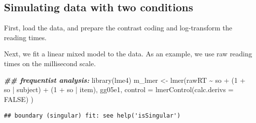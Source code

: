 \documentclass[
  12pt,
]{krantz}
\newenvironment{Shaded}{\begin{snugshade}}{\end{snugshade}}
\newcommand{\AttributeTok}[1]{\textcolor[rgb]{0.77,0.63,0.00}{#1}}
\newcommand{\ConstantTok}[1]{\textcolor[rgb]{0.00,0.00,0.00}{#1}}
\newcommand{\DecValTok}[1]{\textcolor[rgb]{0.00,0.00,0.81}{#1}}
\newcommand{\DocumentationTok}[1]{\textcolor[rgb]{0.56,0.35,0.01}{\textbf{\textit{#1}}}}
\newcommand{\FunctionTok}[1]{\textcolor[rgb]{0.00,0.00,0.00}{#1}}
\newcommand{\NormalTok}[1]{#1}
\newcommand{\OtherTok}[1]{\textcolor[rgb]{0.56,0.35,0.01}{#1}}
\newcommand{\SpecialCharTok}[1]{\textcolor[rgb]{0.00,0.00,0.00}{#1}}
\newcommand{\StringTok}[1]{\textcolor[rgb]{0.31,0.60,0.02}{#1}}
\theoremstyle{definition}
\theoremstyle{definition}
\theoremstyle{definition}
\theoremstyle{definition}
\theoremstyle{remark}
\begin{document}
\hypertarget{simulating-data-with-two-conditions}{%
\subsection{Simulating data with two conditions}\label{simulating-data-with-two-conditions}}

First, load the data, and prepare the contrast coding and log-transform the reading times.

\begin{Shaded}
\end{Shaded}

Next, we fit a linear mixed model to the data. As an example, we use raw reading times on the millisecond scale.

\begin{Shaded}
\begin{Highlighting}[]
\DocumentationTok{\#\# frequentist analysis:}
\FunctionTok{library}\NormalTok{(lme4)}
\NormalTok{m\_lmer }\OtherTok{\textless{}{-}} \FunctionTok{lmer}\NormalTok{(rawRT }\SpecialCharTok{\textasciitilde{}}\NormalTok{ so }\SpecialCharTok{+}\NormalTok{ (}\DecValTok{1} \SpecialCharTok{+}\NormalTok{ so }\SpecialCharTok{|}\NormalTok{ subject) }\SpecialCharTok{+}\NormalTok{ (}\DecValTok{1} \SpecialCharTok{+}\NormalTok{ so }\SpecialCharTok{|}\NormalTok{ item), gg05e1,}
  \AttributeTok{control =} \FunctionTok{lmerControl}\NormalTok{(}\AttributeTok{calc.derivs =} \ConstantTok{FALSE}\NormalTok{)}
\NormalTok{)}
\end{Highlighting}
\end{Shaded}

\begin{verbatim}
## boundary (singular) fit: see help('isSingular')
\end{verbatim}
\end{document}
